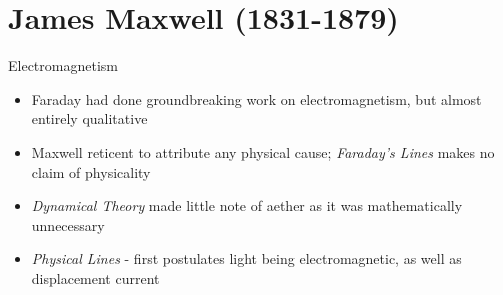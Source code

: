 \documentclass{beamer}
\begin{document}
\section{James Maxwell (1831-1879)}%
\begin{frame}{Electromagnetism}
	\begin{itemize}
		\item Faraday had done groundbreaking work on electromagnetism, but almost entirely qualitative
		\item Maxwell reticent to attribute any physical cause; \emph{Faraday's Lines}{\only \autocite{maxfaradaylines}} makes no claim of physicality
		\item \emph{Dynamical Theory}\autocite{maxdynamicaltheory} made little note of aether as it was mathematically unnecessary
		\item \emph{Physical Lines}{ \autocite{maxphysicallines}} - first postulates light being electromagnetic, as well as displacement current
	\end{itemize}
\end{frame}
\end{document}
